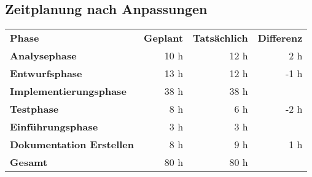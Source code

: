 \subsection{Zeitplanung nach Anpassungen}
\begin{tabularx}{\textwidth}{Xrrr}
\label{app:Zeitnachher} \\
\rowcolor{heading}\textbf{Phase} & \textbf{Geplant} & \textbf{Tatsächlich} & \textbf{Differenz} \\
\textbf{Analysephase} & 10 h   & 12 h  & 2 h \\
\rowcolor{odd}\textbf{Entwurfsphase} & 13 h  & 12 h  & -1 h \\
\textbf{Implementierungsphase} & 38 h  & 38 h  &   \\
\rowcolor{odd}\textbf{Testphase} & 8 h   & 6 h   & -2 h  \\
\textbf{Einführungsphase} & 3 h   & 3 h   &  \\
\rowcolor{odd}\textbf{Dokumentation Erstellen} & 8 h   & 9 h  & 1 h \\
\hline
\hline
\rowcolor{heading}\textbf{Gesamt} & 80 h  & 80 h  &  \\
\end{tabularx}
